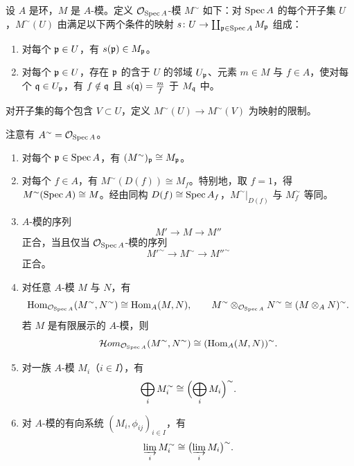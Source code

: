 设 $A$ 是环，$M$ 是 $A$-模。定义 $\mathcal{O}_{\operatorname{Spec} A}$-模 $M^\sim$ 如下：对 $\operatorname{Spec} A$ 的每个开子集 $U$，$M^\sim(U)$ 由满足以下两个条件的映射 $s\colon U\to\coprod_{\mathfrak{p}\in\operatorname{Spec} A}M_{\mathfrak{p}}$ 组成：
\begin{enumerate}[label=(\alph*),leftmargin=2.8em]
  \item 对每个 $\mathfrak{p}\in U$，有 $s(\mathfrak{p})\in M_{\mathfrak{p}}$。
  \item 对每个 $\mathfrak{p}\in U$，存在 $\mathfrak{p}$ 的含于 $U$ 的邻域 $U_{\mathfrak{p}}$、元素 $m\in M$ 与 $f\in A$，使对每个 $\mathfrak{q}\in U_{\mathfrak{p}}$，有 $f\notin\mathfrak{q}$ 且 $s(\mathfrak{q})=\frac{m}{f}$ 于 $M_{\mathfrak{q}}$ 中。
\end{enumerate}
对开子集的每个包含 $V\subset U$，定义 $M^\sim(U)\to M^\sim(V)$ 为映射的限制。

注意有 $A^\sim=\mathcal{O}_{\operatorname{Spec} A}$。

\begin{proposition}\label{it:1.4.2}
\begin{enumerate}[label=(\roman*),leftmargin=2.8em]
  \item 对每个 $\mathfrak{p}\in\operatorname{Spec} A$，有 $(M^\sim)_{\mathfrak{p}}\cong M_{\mathfrak{p}}$。
  \item 对每个 $f\in A$，有 $M^\sim(D(f))\cong M_f$。特别地，取 $f=1$，得 $M^\sim(\operatorname{Spec} A)\cong M$。经由同构 $D(f)\cong\operatorname{Spec} A_f$，$M^\sim|_{D(f)}$ 与 $M_f^\sim$ 等同。
  \item $A$-模的序列
  \[
  M'\to M\to M''
  \]
  正合，当且仅当 $\mathcal{O}_{\operatorname{Spec} A}$-模的序列
  \[
  M'^\sim\to M^\sim\to M''^\sim
  \]
  正合。
  \item 对任意 $A$-模 $M$ 与 $N$，有
  \[
  \operatorname{Hom}_{\mathcal{O}_{\operatorname{Spec} A}}(M^\sim,N^\sim)\cong\operatorname{Hom}_A(M,N),\qquad
  M^\sim\otimes_{\mathcal{O}_{\operatorname{Spec} A}}N^\sim\cong(M\otimes_A N)^\sim.
  \]
  若 $M$ 是有限展示的 $A$-模，则
  \[
  \mathcal{H}om_{\mathcal{O}_{\operatorname{Spec} A}}(M^\sim,N^\sim)\cong(\operatorname{Hom}_A(M,N))^\sim.
  \]
  \item 对一族 $A$-模 $M_i$（$i\in I$），有
  \[
  \bigoplus_i M_i^\sim\cong\Bigl(\bigoplus_i M_i\Bigr)^\sim.
  \]
  \item 对 $A$-模的有向系统 $(M_i,\phi_{ij})_{i\in I}$，有
  \[
  \varinjlim_i M_i^\sim\cong\bigl(\varinjlim_i M_i\bigr)^\sim.
  \]
\end{enumerate}
\end{proposition}

